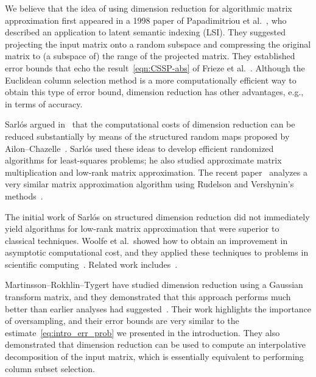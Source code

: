 \documentclass[final]{siamltex}
\newcounter{algorithm}[section]
\newcommand{\pgnotate}[1]{{\color{blue}[#1]}}
\begin{document}
We believe that the idea of using dimension reduction for algorithmic
matrix approximation first appeared in
a 1998 paper of Papadimitriou et al.~\cite{PRTV98:Latent-Semantic,papadimitriou},
who described an application to latent
semantic indexing (LSI). They suggested projecting the input matrix onto a
random subspace %
and compressing the original matrix to (a subspace of) the range
of the projected matrix.  They established error bounds that echo the
result~\eqref{eqn:CSSP-abs} of Frieze et al.~\cite{kannan_vempala}.
Although the Euclidean column selection method is a more computationally
efficient way to obtain this type of error bound, dimension reduction has
other advantages, e.g., in terms of accuracy.

Sarl{\'o}s argued in~\cite{Sar06:Improved-Approximation} that the
computational costs of dimension reduction can be reduced
substantially by means of the structured random maps proposed by
Ailon--Chazelle~\cite{AC06:Approximate-Nearest}.
Sarl{\'o}s used these ideas to develop efficient randomized algorithms
for least-squares problems; he also studied approximate
matrix multiplication and low-rank matrix approximation.
The recent paper~\cite{NDT09:Fast-Efficient} analyzes
a very similar matrix approximation algorithm
using Rudelson and Vershynin's methods~\cite{RV07:Sampling-Large}.

The initial work of Sarl{\'o}s on structured dimension reduction did not
immediately yield algorithms for low-rank matrix approximation
that were superior to classical techniques.
Woolfe et al.~showed how to obtain an improvement in
asymptotic computational cost, and they applied these techniques
to problems in scientific computing~\cite{random2}.
Related work includes~\cite{liberty_diss,2007_PNAS}.

Martinsson--Rokhlin--Tygert have studied dimension
reduction using a Gaussian transform matrix, and they demonstrated
that this approach performs much better than earlier analyses had
suggested~\cite{random1}. Their work highlights the importance of
oversampling, and their error bounds are very similar to the
estimate~\eqref{eq:intro_err_prob} we presented in the introduction.
They also demonstrated that dimension reduction can be used to
compute an interpolative decomposition of the input matrix, which is
essentially equivalent to performing column subset selection.
\end{document}
